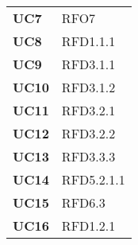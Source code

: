 \begin{longtable}[H]{>{\centering\bfseries}m{8cm}  >{\centering\arraybackslash}m{8cm}}
  \textbf{UC7} & RFO7 \\
  \textbf{UC8} & RFD1.1.1 \\
  \textbf{UC9} & RFD3.1.1 \\
  \textbf{UC10} & RFD3.1.2 \\
  \textbf{UC11} & RFD3.2.1 \\
  \textbf{UC12} & RFD3.2.2 \\
  \textbf{UC13} & RFD3.3.3 \\
  \textbf{UC14} & RFD5.2.1.1 \\
  \textbf{UC15} & RFD6.3 \\
  \textbf{UC16} & RFD1.2.1 \\

\end{longtable}
